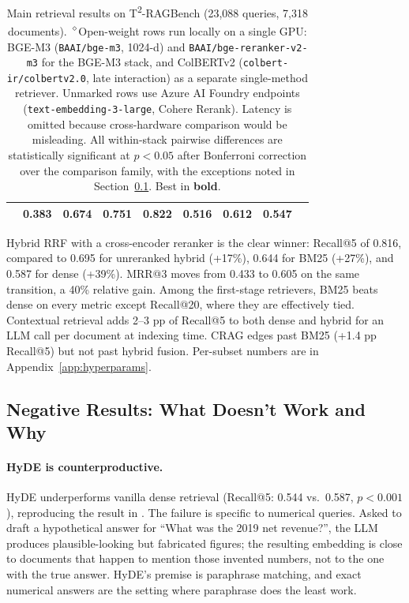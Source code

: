 \documentclass{article}
\begin{document}
\begin{table}[t]
\begin{tabular}{llccccccc}
                                & 0.383 & 0.674 & 0.751 & 0.822 & 0.516 & 0.612 & 0.547 \\
\bottomrule
\end{tabular}
\vspace{4pt}
\caption{Main retrieval results on T\textsuperscript{2}-RAGBench (23,088 queries, 7,318 documents). \textsuperscript{$\diamond$}Open-weight rows run locally on a single GPU: BGE-M3 (\texttt{BAAI/bge-m3}, 1024-d) and \texttt{BAAI/bge-reranker-v2-m3} for the BGE-M3 stack, and ColBERTv2 (\texttt{colbert-ir/colbertv2.0}, late interaction) as a separate single-method retriever. Unmarked rows use Azure AI Foundry endpoints (\texttt{text-embedding-3-large}, Cohere Rerank). Latency is omitted because cross-hardware comparison would be misleading. All within-stack pairwise differences are statistically significant at $p < 0.05$ after Bonferroni correction over the comparison family, with the exceptions noted in Section~\ref{sec:negative}. Best in \textbf{bold}.}
\label{tab:main_results}
\end{table}

Hybrid RRF with a cross-encoder reranker is the clear winner: Recall@5 of 0.816, compared to 0.695 for unreranked hybrid (+17\%), 0.644 for BM25 (+27\%), and 0.587 for dense (+39\%). MRR@3 moves from 0.433 to 0.605 on the same transition, a 40\% relative gain. Among the first-stage retrievers, BM25 beats dense on every metric except Recall@20, where they are effectively tied. Contextual retrieval adds 2--3 pp of Recall@5 to both dense and hybrid for an LLM call per document at indexing time. CRAG edges past BM25 (+1.4 pp Recall@5) but not past hybrid fusion. Per-subset numbers are in Appendix~\ref{app:hyperparams}.

\subsection{Negative Results: What Doesn't Work and Why}
\label{sec:negative}

\paragraph{HyDE is counterproductive.} HyDE underperforms vanilla dense retrieval (Recall@5: 0.544 vs.\ 0.587, $p < 0.001$), reproducing the result in \citet{strich2026t2ragbench}. The failure is specific to numerical queries. Asked to draft a hypothetical answer for ``What was the 2019 net revenue?'', the LLM produces plausible-looking but fabricated figures; the resulting embedding is close to documents that happen to mention those invented numbers, not to the one with the true answer. HyDE's premise is paraphrase matching, and exact numerical answers are the setting where paraphrase does the least work.
\end{document}
